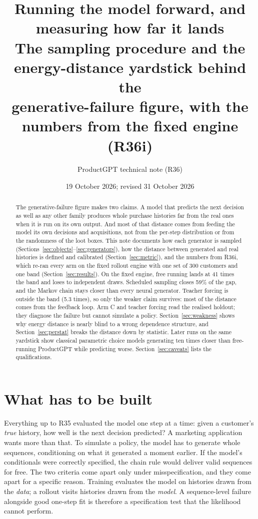 \documentclass[11pt]{article}
\title{\textbf{Running the model forward, and measuring how far it lands}\\[2pt]
\large The sampling procedure and the energy-distance yardstick behind the\\
generative-failure figure, with the numbers from the fixed engine (R36i)}
\author{ProductGPT technical note (R36)}
\date{19 October 2026; revised 31 October 2026}
\begin{document}
\maketitle

\begin{abstract}
\noindent The generative-failure figure makes two claims. A model that predicts
the next decision as well as any other family produces whole purchase histories
far from the real ones when it is run on its own output. And most of that
distance comes from feeding the model its own decisions and acquisitions, not
from the per-step distribution or from the randomness of the loot boxes. This
note documents how each generator is sampled
(Sections~\ref{sec:objects}--\ref{sec:generators}), how the distance between
generated and real histories is defined and calibrated
(Section~\ref{sec:metric}), and the numbers from R36i, which re-ran every arm
on the fixed rollout engine with one set of 300 customers and one band
(Section~\ref{sec:results}). On the fixed engine, free running lands at 41
times the band and loses to independent draws. Scheduled sampling closes 59\%
of the gap, and the Markov chain stays closer than every neural generator.
Teacher forcing is outside the band (5.3 times), so only the weaker claim
survives: most of the distance comes from the feedback loop. Arm C and teacher
forcing read the realised holdout; they diagnose the failure but cannot
simulate a policy. Section~\ref{sec:weakness} shows why energy distance is
nearly blind to a wrong dependence structure, and Section~\ref{sec:perstat}
breaks the distance down by statistic. Later runs on the same yardstick show
classical parametric choice models generating ten times closer than free-running
ProductGPT while predicting worse. Section~\ref{sec:caveats} lists the
qualifications.
\end{abstract}

\section{What has to be built}\label{sec:question}

Everything up to R35 evaluated the model one step at a time: given a customer's
\emph{true} history, how well is the next decision predicted? A marketing
application wants more than that. To simulate a policy, the model has to
generate whole sequences, conditioning on what it generated a moment earlier.
If the model's conditionals were correctly specified, the chain rule would
deliver valid sequences for free. The two criteria come apart only under
misspecification, and they come apart for a specific reason. Training evaluates
the model on histories drawn from the \emph{data}; a rollout visits histories
drawn from the \emph{model}. A sequence-level failure alongside good one-step
fit is therefore a specification test that the likelihood cannot perform.
\end{document}
